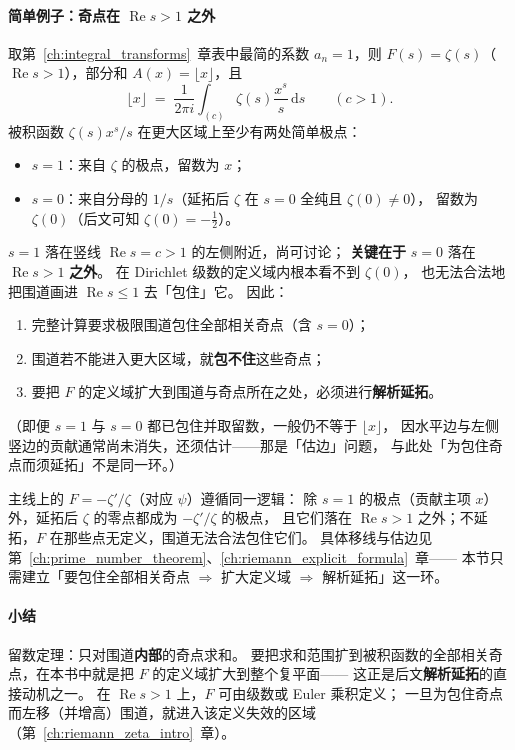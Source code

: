 \paragraph{简单例子：奇点在 $\operatorname{Re}s>1$ 之外}
取第~\ref{ch:integral_transforms}~章表中最简的系数 $a_n=1$，则
$F(s)=\zeta(s)$（$\operatorname{Re}s>1$），部分和 $A(x)=\lfloor x\rfloor$，且
\[
  \lfloor x\rfloor
  \;=\;
  \frac{1}{2\pi i}
  \int_{(c)}\zeta(s)\frac{x^s}{s}\,\mathrm{d}s
  \qquad(c>1).
\]
被积函数 $\zeta(s)x^s/s$ 在更大区域上至少有两处简单极点：
\begin{itemize}
  \item $s=1$：来自 $\zeta$ 的极点，留数为 $x$；
  \item $s=0$：来自分母的 $1/s$（延拓后 $\zeta$ 在 $s=0$ 全纯且 $\zeta(0)\neq 0$），
        留数为 $\zeta(0)$（后文可知 $\zeta(0)=-\frac12$）。
\end{itemize}
$s=1$ 落在竖线 $\operatorname{Re}s=c>1$ 的左侧附近，尚可讨论；
\textbf{关键在于} $s=0$ 落在 $\operatorname{Re}s>1$ \textbf{之外}。
在 Dirichlet 级数的定义域内根本看不到 $\zeta(0)$，
也无法合法地把围道画进 $\operatorname{Re}s\le 1$ 去「包住」它。
因此：
\begin{enumerate}
  \item 完整计算要求极限围道包住全部相关奇点（含 $s=0$）；
  \item 围道若不能进入更大区域，就\textbf{包不住}这些奇点；
  \item 要把 $F$ 的定义域扩大到围道与奇点所在之处，必须进行\textbf{解析延拓}。
\end{enumerate}
（即便 $s=1$ 与 $s=0$ 都已包住并取留数，一般仍不等于 $\lfloor x\rfloor$，
因水平边与左侧竖边的贡献通常尚未消失，还须估计——那是「估边」问题，
与此处「为包住奇点而须延拓」不是同一环。）

主线上的 $F=-\zeta'/\zeta$（对应 $\psi$）遵循同一逻辑：
除 $s=1$ 的极点（贡献主项 $x$）外，延拓后 $\zeta$ 的零点都成为 $-\zeta'/\zeta$ 的极点，
且它们落在 $\operatorname{Re}s>1$ 之外；不延拓，$F$ 在那些点无定义，围道无法合法包住它们。
具体移线与估边见第~\ref{ch:prime_number_theorem}、\ref{ch:riemann_explicit_formula}~章——
本节只需建立「要包住全部相关奇点 $\Rightarrow$ 扩大定义域 $\Rightarrow$ 解析延拓」这一环。

\paragraph{小结}
留数定理：只对围道\textbf{内部}的奇点求和。
要把求和范围扩到被积函数的全部相关奇点，在本书中就是把 $F$ 的定义域扩大到整个复平面——
这正是后文\textbf{解析延拓}的直接动机之一。
在 $\operatorname{Re}s>1$ 上，$F$ 可由级数或 Euler 乘积定义；
一旦为包住奇点而左移（并增高）围道，就进入该定义失效的区域
（第~\ref{ch:riemann_zeta_intro}~章）。

